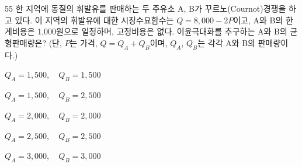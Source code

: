 \begin{question}{55}
한 지역에 동질의 휘발유를 판매하는 두 주유소 A, B가 꾸르노(Cournot)경쟁을 하고 있다. 이 지역의 휘발유에 대한 시장수요함수는 $Q=8{,}000-2P$이고, A와 B의 한계비용은 1,000원으로 일정하며, 고정비용은 없다. 이윤극대화를 추구하는 A와 B의 균형판매량은? (단, $P$는 가격, $Q=Q_{A}+Q_{B}$이며, $Q_{A}$, $Q_{B}$는 각각 A와 B의 판매량이다.)
\begin{choices}
  \item $Q_{A}=1{,}500,\quad Q_{B}=1{,}500$
  \item $Q_{A}=1{,}500,\quad Q_{B}=2{,}500$
  \item $Q_{A}=2{,}000,\quad Q_{B}=2{,}000$
  \item $Q_{A}=2{,}500,\quad Q_{B}=2{,}500$
  \item $Q_{A}=3{,}000,\quad Q_{B}=3{,}000$
\end{choices}
\end{question}
